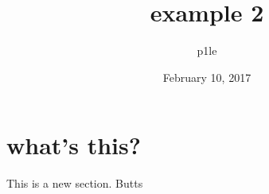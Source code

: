 \documentclass[a4paper, 11pt]{article}
\begin{document}
\title{example 2}
\author{p1le}
\date{February 10, 2017}
\maketitle
\section{what's this?}
This is a new section. Butts
\end{document}
